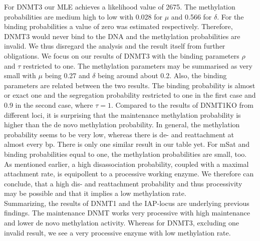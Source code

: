 For DNMT3 our \ac{MLE} achieves a likelihood value of 2675. The methylation probabilities are medium high to low with 0.028 for $\mu$ and 0.566 for $\delta$. For the binding probabilities a value of zero was estimated respectively. Therefore, DNMT3 would never bind to the DNA and the methylation probabilities are invalid. We thus disregard the analysis and the result itself from further obligations.\newline
We focus on our results of DNMT3 with the binding parameters $\rho$ and $\tau$ restricted to one. The methylation parameters may be summarised as very small with $\mu$ being 0.27 and $\delta$ being around about 0.2. Also, the binding parameters are related between the two results. The binding probability is almost or exact one and the segregation probability restricted to one in the first case and 0.9 in the second case, where $\tau = 1$. Compared to the results of DNMT1KO from different loci, it is surprising that the maintenance methylation probability is higher than the de novo methylation probability. In general, the methylation probability seems to be very low, whereas there is de- and reattachment at almost every \ac{bp}. There is only one similar result in our table yet. For mSat and binding probabilities equal to one, the methylation probabilities are small, too. As mentioned earlier, a high disassociation probability, coupled with a maximal attachment rate, is equipollent to a processive working enzyme. We therefore can conclude, that a high dis- and reattachment probability and thus processivity may be possible and that it implies a low methylation rate.\\

Summarizing, the results of DNMT1 and the IAP-locus are underlying previous findings. The maintenance \ac{DNMT} works very processive with high maintenance and lower de novo methylation activity. Whereas for DNMT3, excluding one invalid result, we see a very processive enzyme with low methylation rate.

